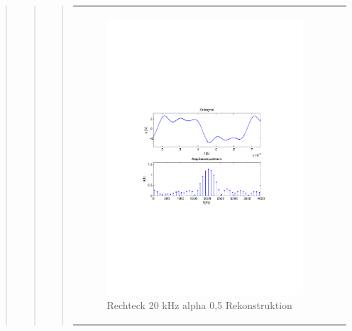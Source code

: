 \begin{quote}
\begin{quote}
\begin{quote}
\begin{center}
\begin{tabular}{ll}
                \begin{minipage}{0.6\textwidth}
                    \begin{figure}[H]
                        \includegraphics[scale=0.7, trim = 35mm 100mm 35mm 95mm, clip]{Bilder/flatrec20_05}
                       \caption{Rechteck 20 kHz alpha 0,5 Rekonstruktion}
		              \label{fig:flatrec20_05}
                    \end{figure}
                \end{minipage}
            
            \end{tabular}
            \end{center}
            
            

\end{quote}
\end{quote}
\end{quote}

